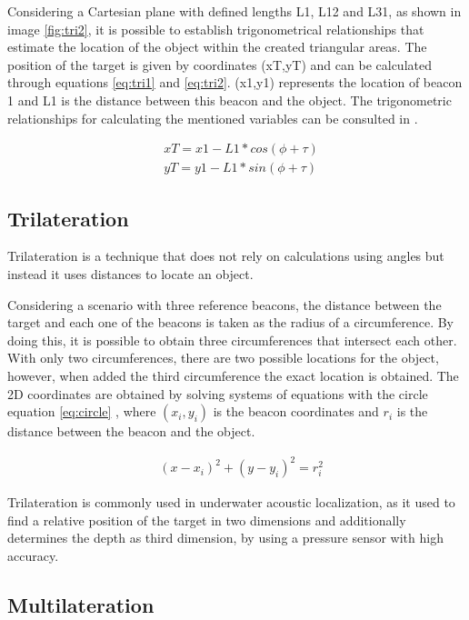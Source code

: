 Considering a Cartesian plane with defined lengths L1, L12 and L31, as shown in image \ref{fig:tri2}, it is possible to establish trigonometrical relationships that estimate the location of the object within the created triangular areas. The position of the target is given by coordinates (xT,yT) and can be calculated through equations \ref{eq:tri1} and \ref{eq:tri2}. (x1,y1) represents the location of beacon 1 and L1 is the distance between this beacon and the object. The trigonometric relationships for calculating the mentioned variables can be consulted in \cite{triangalgo}.

\begin{eqnarray}
& xT = x1 - L1 * cos(\phi + \tau)
\label{eq:tri1}\\
& yT = y1 - L1 * sin(\phi + \tau)
\label{eq:tri2}
\end{eqnarray}

\subsection{Trilateration}

Trilateration is a technique that does not rely on calculations using angles but instead it uses distances to locate an object.

Considering a scenario with three reference beacons, the distance between the target and each one of the beacons is taken as the radius of a circumference. By doing this, it is possible to obtain three circumferences that intersect each other. With only two circumferences, there are two possible locations for the object, however, when added the third circumference the exact location is obtained. The 2D coordinates are obtained by solving systems of equations with the circle equation \ref{eq:circle} \cite{trilat}, where $(x_{i}, y_{i})$ is the beacon coordinates and $r_{i}$ is the distance between the beacon and the object.

\begin{eqnarray}
& (x - x_{i})^2 + (y - y_{i})^2 = r_{i}^2 
\label{eq:circle}
\end{eqnarray}

Trilateration is commonly used in underwater acoustic localization, as it used to find a relative position of the target in two dimensions and additionally determines the depth as third dimension, by using a pressure sensor with high accuracy.

\subsection{Multilateration}

